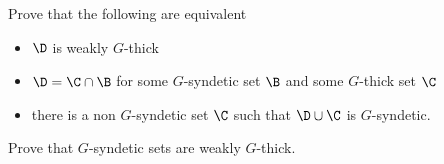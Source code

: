 



\begin{exercise}
  Prove that the following are equivalent
  \begin{itemize}
    \item[1.] $\D$ is weakly $G$-thick
    \item[2.] $\D=\C\cap\B$ for some $G$-syndetic set $\B$ and some $G$-thick set $\C$
    \item [3.] there is a non $G$-syndetic set $\C$ such that $\D\cup\C$ is $G$-syndetic.
  \end{itemize}
\end{exercise}

\begin{exercise}
  Prove that $G$-syndetic sets are weakly $G$-thick.
\end{exercise}


